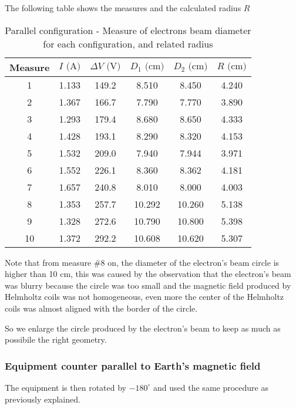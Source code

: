 The following table shows the measures and the calculated radius $R$
\begin{table}[!htbp]
    {\par\centering
    \begin{tabular}{cccccc}
        \hline
        Measure & $I \text{ (A)}$ & $\Delta V \text{ (V)}$ & $D_1 \text{ (cm)}$ & $D_2 \text{ (cm)}$ & $R \text{ (cm)}$\\
        \hline
        1   &   1.133&   149.2&   8.510&   8.450& 4.240\\
        2   &   1.367&   166.7&   7.790&   7.770& 3.890\\
        3   &   1.293&   179.4&   8.680&   8.650& 4.333\\
        4   &   1.428&   193.1&   8.290&   8.320& 4.153\\
        5   &   1.532&   209.0&   7.940&   7.944& 3.971\\
        6   &   1.552&   226.1&   8.360&   8.362& 4.181\\
        7   &   1.657&   240.8&   8.010&   8.000& 4.003\\
        8   &   1.353&   257.7&  10.292&  10.260& 5.138\\
        9   &   1.328&   272.6&  10.790&  10.800& 5.398\\
        10  &   1.372&   292.2&  10.608&  10.620& 5.307\\
        \hline
    \end{tabular}
    \par}
    \caption{Parallel configuration - Measure of electrons beam diameter for each configuration, and related radius}
\end{table}

Note that from measure $\#8$ on, the diameter of the electron's beam circle is higher than 10 cm, this was caused by the observation that the electron's beam was blurry because the circle was too small and the magnetic field produced by Helmholtz coils was not homogeneous, even more the center of the Helmholtz coils was almost aligned with the border of the circle.

So we enlarge the circle produced by the electron's beam to keep as much as possibile the right geometry.

\subsubsection{Equipment counter parallel to Earth's magnetic field}
The equipment is then rotated by $-180^{\circ}$ and used the same procedure as previously explained.

